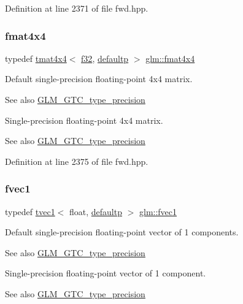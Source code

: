 Definition at line 2371 of file fwd.\+hpp.

\mbox{\label{group__gtc__type__precision_ga16b508b75c7213ba6b24055ff3b7503d}} 
\subsubsection{\texorpdfstring{fmat4x4}{fmat4x4}}
{\footnotesize\ttfamily typedef \mbox{\hyperlink{structglm_1_1tmat4x4}{tmat4x4}}$<$ \mbox{\hyperlink{group__gtc__type__precision_ga0ec999b57f5330d9021256e96038df04}{f32}}, \mbox{\hyperlink{namespaceglm_a0f04f086094c747d227af4425893f545a9d21ccd8b5a009ec7eb7677befc3bf51}{defaultp}} $>$ \mbox{\hyperlink{group__gtc__type__precision_ga16b508b75c7213ba6b24055ff3b7503d}{glm\+::fmat4x4}}}

Default single-\/precision floating-\/point 4x4 matrix. \begin{DoxySeeAlso}{See also}
\mbox{\hyperlink{group__gtc__type__precision}{G\+L\+M\+\_\+\+G\+T\+C\+\_\+type\+\_\+precision}}
\end{DoxySeeAlso}
Single-\/precision floating-\/point 4x4 matrix. \begin{DoxySeeAlso}{See also}
\mbox{\hyperlink{group__gtc__type__precision}{G\+L\+M\+\_\+\+G\+T\+C\+\_\+type\+\_\+precision}} 
\end{DoxySeeAlso}


Definition at line 2375 of file fwd.\+hpp.

\mbox{\label{group__gtc__type__precision_gaa732e5d06540922c44d3e35f32d6e948}} 
\subsubsection{\texorpdfstring{fvec1}{fvec1}}
{\footnotesize\ttfamily typedef \mbox{\hyperlink{structglm_1_1tvec1}{tvec1}}$<$ float, \mbox{\hyperlink{namespaceglm_a0f04f086094c747d227af4425893f545a9d21ccd8b5a009ec7eb7677befc3bf51}{defaultp}} $>$ \mbox{\hyperlink{group__gtc__type__precision_gaa732e5d06540922c44d3e35f32d6e948}{glm\+::fvec1}}}

Default single-\/precision floating-\/point vector of 1 components. \begin{DoxySeeAlso}{See also}
\mbox{\hyperlink{group__gtc__type__precision}{G\+L\+M\+\_\+\+G\+T\+C\+\_\+type\+\_\+precision}}
\end{DoxySeeAlso}
Single-\/precision floating-\/point vector of 1 component. \begin{DoxySeeAlso}{See also}
\mbox{\hyperlink{group__gtc__type__precision}{G\+L\+M\+\_\+\+G\+T\+C\+\_\+type\+\_\+precision}} 
\end{DoxySeeAlso}


